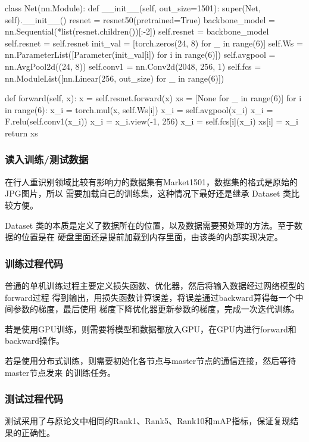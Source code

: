 \begin{python}
class Net(nn.Module):
    def __init__(self, out_size=1501):
        super(Net, self).__init__()
        resnet = resnet50(pretrained=True)
        backbone_model = nn.Sequential(*list(resnet.children())[:-2])
        self.resnet = backbone_model
        self.resnet = self.resnet
        init_val = [torch.zeros(24, 8) for _ in range(6)]
        self.Ws = nn.ParameterList([Parameter(init_val[i]) for i in range(6)])
        self.avgpool = nn.AvgPool2d((24, 8))
        self.conv1 = nn.Conv2d(2048, 256, 1)
        self.fcs = nn.ModuleList([nn.Linear(256, out_size) for _ in range(6)])

    def forward(self, x):
        x = self.resnet.forward(x)
        xs = [None for _ in range(6)]
        for i in range(6):
            x_i = torch.mul(x, self.Ws[i])
            x_i = self.avgpool(x_i)
            x_i = F.relu(self.conv1(x_i))
            x_i = x_i.view(-1, 256)
            x_i = self.fcs[i](x_i)
            xs[i] = x_i
        return xs
\end{python}

\subsubsection{读入训练/测试数据}
在行人重识别领域比较有影响力的数据集有Market1501，数据集的格式是原始的JPG图片，所以
需要加载自己的训练集，这种情况下最好还是继承 Dataset 类比较方便。

Dataset 类的本质是定义了数据所在的位置，以及数据需要预处理的方法。至于数据的位置是在
硬盘里面还是提前加载到内存里面，由该类的内部实现决定。

\subsubsection{训练过程代码}

普通的单机训练过程主要定义损失函数、优化器，然后将输入数据经过网络模型的forward过程
得到输出，用损失函数计算误差，将误差通过backward算得每一个中间参数的梯度，最后使用
梯度下降优化器更新参数的梯度，完成一次迭代训练。

若是使用GPU训练，则需要将模型和数据都放入GPU，在GPU内进行forward和backward操作。

若是使用分布式训练，则需要初始化各节点与master节点的通信连接，然后等待master节点发来
的训练任务。

\subsubsection{测试过程代码}

测试采用了与原论文中相同的Rank1、Rank5、Rank10和mAP指标，保证复现结果的正确性。
